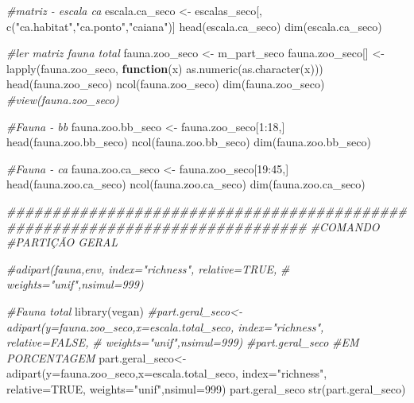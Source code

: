 \documentclass[
  letterpaper,
  DIV=11,
  numbers=noendperiod]{scrartcl}
\newenvironment{Shaded}{}{}
\newcommand{\AttributeTok}[1]{\textcolor[rgb]{0.49,0.56,0.16}{#1}}
\newcommand{\CommentTok}[1]{\textcolor[rgb]{0.38,0.63,0.69}{\textit{#1}}}
\newcommand{\ConstantTok}[1]{\textcolor[rgb]{0.53,0.00,0.00}{#1}}
\newcommand{\ControlFlowTok}[1]{\textcolor[rgb]{0.00,0.44,0.13}{\textbf{#1}}}
\newcommand{\DecValTok}[1]{\textcolor[rgb]{0.25,0.63,0.44}{#1}}
\newcommand{\DocumentationTok}[1]{\textcolor[rgb]{0.73,0.13,0.13}{\textit{#1}}}
\newcommand{\FunctionTok}[1]{\textcolor[rgb]{0.02,0.16,0.49}{#1}}
\newcommand{\NormalTok}[1]{#1}
\newcommand{\OtherTok}[1]{\textcolor[rgb]{0.00,0.44,0.13}{#1}}
\newcommand{\SpecialCharTok}[1]{\textcolor[rgb]{0.25,0.44,0.63}{#1}}
\newcommand{\StringTok}[1]{\textcolor[rgb]{0.25,0.44,0.63}{#1}}
\begin{document}
\begin{Shaded}
\begin{Highlighting}[numbers=left,,]
\CommentTok{\#matriz {-} escala ca}
\NormalTok{escala.ca\_seco }\OtherTok{\textless{}{-}}\NormalTok{ escalas\_seco[, }\FunctionTok{c}\NormalTok{(}\StringTok{"ca.habitat"}\NormalTok{,}\StringTok{"ca.ponto"}\NormalTok{,}\StringTok{"caiana"}\NormalTok{)]}
\FunctionTok{head}\NormalTok{(escala.ca\_seco)}
\FunctionTok{dim}\NormalTok{(escala.ca\_seco)}

\CommentTok{\#ler matriz fauna total}
\NormalTok{fauna.zoo\_seco }\OtherTok{\textless{}{-}}\NormalTok{ m\_part\_seco}
\NormalTok{fauna.zoo\_seco[] }\OtherTok{\textless{}{-}} \FunctionTok{lapply}\NormalTok{(fauna.zoo\_seco, }\ControlFlowTok{function}\NormalTok{(x) }\FunctionTok{as.numeric}\NormalTok{(}\FunctionTok{as.character}\NormalTok{(x)))}
\FunctionTok{head}\NormalTok{(fauna.zoo\_seco)}
\FunctionTok{ncol}\NormalTok{(fauna.zoo\_seco)}
\FunctionTok{dim}\NormalTok{(fauna.zoo\_seco)}
\CommentTok{\#view(fauna.zoo\_seco)}

\CommentTok{\#Fauna {-} bb}
\NormalTok{fauna.zoo.bb\_seco }\OtherTok{\textless{}{-}}\NormalTok{ fauna.zoo\_seco[}\DecValTok{1}\SpecialCharTok{:}\DecValTok{18}\NormalTok{,]}
\FunctionTok{head}\NormalTok{(fauna.zoo.bb\_seco)}
\FunctionTok{ncol}\NormalTok{(fauna.zoo.bb\_seco)}
\FunctionTok{dim}\NormalTok{(fauna.zoo.bb\_seco)}

\CommentTok{\#Fauna {-} ca}
\NormalTok{fauna.zoo.ca\_seco }\OtherTok{\textless{}{-}}\NormalTok{ fauna.zoo\_seco[}\DecValTok{19}\SpecialCharTok{:}\DecValTok{45}\NormalTok{,]}
\FunctionTok{head}\NormalTok{(fauna.zoo.ca\_seco)}
\FunctionTok{ncol}\NormalTok{(fauna.zoo.ca\_seco)}
\FunctionTok{dim}\NormalTok{(fauna.zoo.ca\_seco)}

\DocumentationTok{\#\#\#\#\#\#\#\#\#\#\#\#\#\#\#\#\#\#\#\#\#\#\#\#\#\#\#\#\#\#\#\#\#\#\#\#\#\#\#\#\#\#\#\#\#\#\#\#\#\#\#\#\#\#\#\#\#\#\#\#\#\#\#\#\#\#\#\#\#\#\#\#\#\#\#\#\#}
\CommentTok{\#COMANDO}
\CommentTok{\#PARTIÇÃO GERAL}

\CommentTok{\#adipart(fauna,env, index="richness", relative=TRUE,}
\CommentTok{\#        weights="unif",nsimul=999)}

\CommentTok{\#Fauna total}
\FunctionTok{library}\NormalTok{(vegan)}
\CommentTok{\#part.geral\_seco\textless{}{-}adipart(y=fauna.zoo\_seco,x=escala.total\_seco, index="richness", relative=FALSE,}
\CommentTok{\#                    weights="unif",nsimul=999)}
\CommentTok{\#part.geral\_seco}
\CommentTok{\#EM PORCENTAGEM}
\NormalTok{part.geral\_seco}\OtherTok{\textless{}{-}}\FunctionTok{adipart}\NormalTok{(}\AttributeTok{y=}\NormalTok{fauna.zoo\_seco,}\AttributeTok{x=}\NormalTok{escala.total\_seco, }\AttributeTok{index=}\StringTok{"richness"}\NormalTok{, }\AttributeTok{relative=}\ConstantTok{TRUE}\NormalTok{,}
                         \AttributeTok{weights=}\StringTok{"unif"}\NormalTok{,}\AttributeTok{nsimul=}\DecValTok{999}\NormalTok{)}
\NormalTok{part.geral\_seco}
\FunctionTok{str}\NormalTok{(part.geral\_seco)}


\end{Highlighting}
\end{Shaded}
\end{document}
